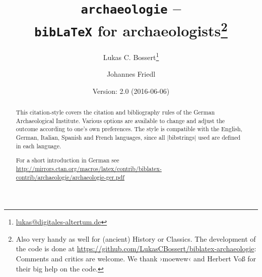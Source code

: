 \documentclass[a4paper,
10pt,
greek,
french,
spanish,
italian,
ngerman,
english
]{ltxdoc}
\begin{document}
\title{\texttt{archaeologie} -- \\\texttt{bib\LaTeX} for archaeologists\footnote{Also very handy as well for (ancient) History or Classics.
The development of the code is done at \url{https://github.com/LukasCBossert/biblatex-archaeologie}: 
Comments and critics are welcome.
We thank  ›moewew‹ and Herbert Voß for their big help on the code.%
}}
\author{Lukas C. Bossert\thanks{\href{mailto:lukas@digitales-altertum.de}{lukas@digitales-altertum.de}} \and Johannes Friedl}
\date{Version: 2.0 (2016-06-06)}
 \maketitle
 \begin{abstract}
\noindent This citation-style covers the citation and bibliography rules of the German Archaeological Institute. 
Various options are available to change and adjust the outcome according to one's own preferences. 
The style is compatible with the English, German, Italian, Spanish and French languages, since all |bibstrings| used are defined in each language.

For a short introduction in German see \url{http://mirrors.ctan.org/macros/latex/contrib/biblatex-contrib/archaeologie/archaeologie-ger.pdf}
 \end{abstract}


\begin{multicols}{2}
\footnotesize\parskip=0mm \tableofcontents
\end{multicols}
\end{document}
